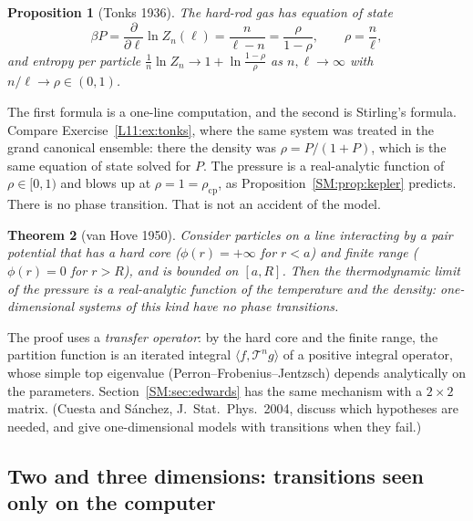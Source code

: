 \documentclass[11pt,openany]{book}
\theoremstyle{plain}
\newtheorem{theorem}{Theorem}[chapter]
\newtheorem{proposition}[theorem]{Proposition}
\theoremstyle{definition}
\theoremstyle{remark}
\begin{document}
\begin{proposition}[Tonks 1936]\label{SM:prop:tonks}
The hard-rod gas has equation of state
\[
  \beta P=\frac{\partial}{\partial\ell}\ln Z_n(\ell)=\frac{n}{\ell-n}=\frac{\rho}{1-\rho},\qquad\rho=\frac n\ell,
\]
and entropy per particle $\frac1n\ln Z_n\to1+\ln\frac{1-\rho}{\rho}$ as $n,\ell\to\infty$ with
$n/\ell\to\rho\in(0,1)$.
\end{proposition}

The first formula is a one-line computation, and the second is Stirling's formula. Compare
Exercise~\ref{L11:ex:tonks}, where the same system was treated in the grand canonical ensemble: there
the density was $\rho=P/(1+P)$, which is the same equation of state solved for $P$. The pressure is a
real-analytic function of $\rho\in[0,1)$ and blows up at $\rho=1=\rho_{\mathrm{cp}}$, as
Proposition~\ref{SM:prop:kepler} predicts. There is no phase transition. That is not an accident of the
model.

\begin{theorem}[van Hove 1950]\label{SM:thm:vanhove}
Consider particles on a line interacting by a pair potential that has a hard core ($\phi(r)=+\infty$ for
$r<a$) and finite range ($\phi(r)=0$ for $r>R$), and is bounded on $[a,R]$. Then the thermodynamic
limit of the pressure is a real-analytic function of the temperature and the density: one-dimensional
systems of this kind have no phase transitions.
\end{theorem}

The proof uses a \emph{transfer operator}: by the hard core and the finite range, the partition function
is an iterated integral $\langle f,\mathcal T^ng\rangle$ of a positive integral operator, whose simple top
eigenvalue (Perron--Frobenius--Jentzsch) depends analytically on the parameters. Section~\ref{SM:sec:edwards}
has the same mechanism with a $2\times2$ matrix. (Cuesta and S\'anchez, J.~Stat.~Phys.\ 2004, discuss
which hypotheses are needed, and give one-dimensional models with transitions when they fail.)

\subsection*{Two and three dimensions: transitions seen only on the computer}
\end{document}
